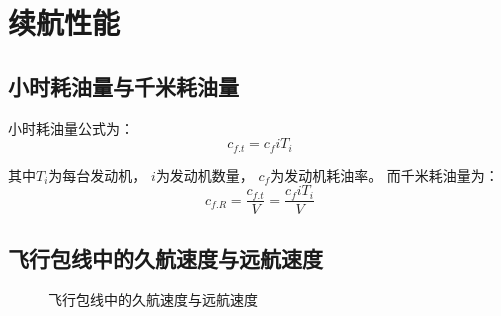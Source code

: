 \section{续航性能}

\subsection{小时耗油量与千米耗油量}

小时耗油量公式为：
\begin{equation}
    c_{f.t} = c_f iT_i
\end{equation}

其中$T_i$为每台发动机，
$i$为发动机数量，
$c_f$为发动机耗油率。
而千米耗油量为：
\begin{equation}
    c_{f.R} = \frac{c_{f.t}}{V} = \frac{c_f iT_i}{V}
\end{equation}

\subsection{飞行包线中的久航速度与远航速度}

\begin{figure}[H]
    \centering
    \caption{飞行包线中的久航速度与远航速度}
    \label{飞行包线中的久航速度与远航速度}
\end{figure}